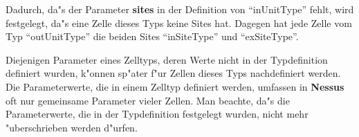 Dadurch, da"s der Parameter {\bf sites} in der Definition
von ``inUnitType'' fehlt, wird festgelegt, da"s eine Zelle dieses Typs
keine Sites hat. Dagegen hat jede Zelle vom Typ ``outUnitType'' die
beiden Sites ``inSiteType'' und ``exSiteType''.

Diejenigen Parameter eines
Zelltyps, deren Werte nicht in der Typdefinition definiert wurden,
k"onnen sp"ater f"ur Zellen dieses Typs nachdefiniert werden. Die
Parameterwerte, die in einem Zelltyp definiert werden, umfassen in
{\bf Nessus} oft nur gemeinsame Parameter vieler Zellen.  Man beachte,
da"s die Parameterwerte, die in der Typdefinition festgelegt wurden,
nicht mehr "uberschrieben werden d"urfen.


